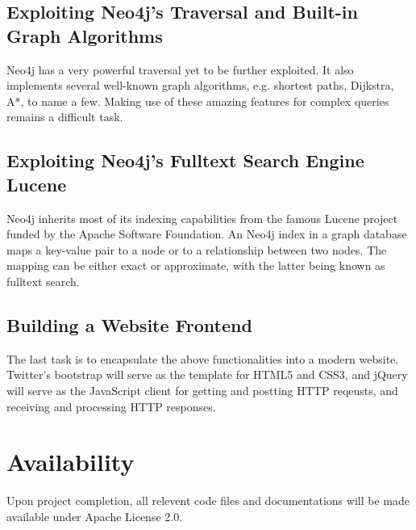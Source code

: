 \documentclass[10pt,conference,compsocconf]{../IEEEtran}
\begin{document}
\subsection{Exploiting Neo4j's Traversal and Built-in Graph Algorithms}

Neo4j has a very powerful traversal yet to be further exploited. It also implements several well-known graph algorithms, e.g. shortest paths, Dijkstra, A*, to name a few. Making use of these amazing features for complex queries remains a difficult task.

\subsection{Exploiting Neo4j's Fulltext Search Engine Lucene}

Neo4j inherits most of its indexing capabilities from the famous Lucene project funded by the Apache Software Foundation. An Neo4j index in a graph database maps a key-value pair to a node or to a relationship between two nodes. The mapping can be either exact or approximate, with the latter being known as fulltext search.

\subsection{Building a Website Frontend}

The last task is to encapsulate the above functionalities into a modern website. Twitter's bootstrap will serve as the template for HTML5 and CSS3, and jQuery will serve as the JavaScript client for getting and postting HTTP reqeusts, and receiving and processing HTTP responses.

\section{Availability}

Upon project completion, all relevent code files and documentations will be made available under Apache License 2.0.






\end{document}
